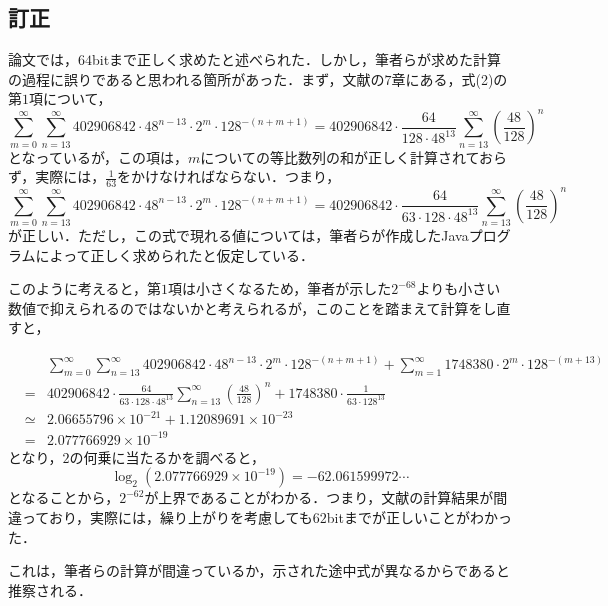 \documentclass{jarticle}
\begin{document}
\subsection{訂正}
論文では，$64$bitまで正しく求めたと述べられた．しかし，筆者らが求めた計算の過程に誤りであると思われる箇所があった．まず，文献の$7$章にある，式(2)の第$1$項について，
\begin{equation}
	\sum _{m=0}^{\infty} 	\sum _{n=13}^{\infty} 402906842 \cdot 48^{n-13} \cdot 2^m \cdot 128^{-(n+m+1)}
	= 402906842 \cdot \frac{64}{128 \cdot 48^{13}} \sum _{n=13}^{\infty} \left( \frac{48}{128} \right) ^n
\end{equation}
となっているが，この項は，$m$についての等比数列の和が正しく計算されておらず，実際には，$\frac{1}{63}$をかけなければならない．つまり，
\begin{equation}
	\sum _{m=0}^{\infty} 	\sum _{n=13}^{\infty} 402906842 \cdot 48^{n-13} \cdot 2^m \cdot 128^{-(n+m+1)}
	= 402906842 \cdot \frac{64}{63 \cdot 128 \cdot 48^{13}} \sum _{n=13}^{\infty} \left( \frac{48}{128} \right) ^n
\end{equation}
が正しい．ただし，この式で現れる値については，筆者らが作成したJavaプログラムによって正しく求められたと仮定している．

このように考えると，第$1$項は小さくなるため，筆者が示した$2^{-68}$よりも小さい数値で抑えられるのではないかと考えられるが，このことを踏まえて計算をし直すと，

\begin{eqnarray}
	&&\sum _{m=0}^{\infty} 	\sum _{n=13}^{\infty} 402906842 \cdot 48^{n-13} \cdot 2^m \cdot 128^{-(n+m+1)}
		+ \sum _{m=1}^{\infty} 1748380 \cdot 2^m \cdot 128^{-(m+13)}\\
	&=& 402906842 \cdot \frac{64}{63 \cdot 128 \cdot 48^{13}} \sum _{n=13}^{\infty} \left( \frac{48}{128} \right) ^n
		+ 1748380 \cdot \frac{1}{63 \cdot 128^13}\\
	&\simeq& 2.06655796 \times 10^{-21} + 1.12089691 \times 10^{-23}\\
	&=& 2.077766929 \times 10^{-19}
\end{eqnarray}
となり，$2$の何乗に当たるかを調べると，
\begin{equation}
	\log_{2} (2.077766929 \times 10^{-19}) = -62.061599972 \cdots
\end{equation}
となることから，$2^{-62}$が上界であることがわかる．つまり，文献の計算結果が間違っており，実際には，繰り上がりを考慮しても$62$bitまでが正しいことがわかった．

これは，筆者らの計算が間違っているか，示された途中式が異なるからであると推察される．
\end{document}
